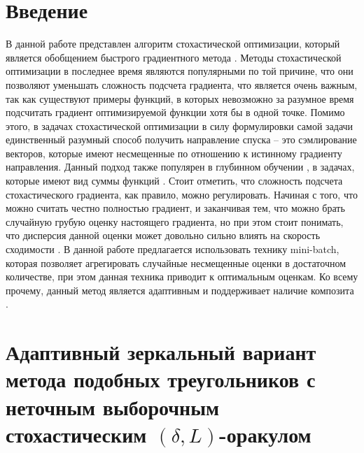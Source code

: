 \documentclass[11pt,a4]{article}
\begin{document}
\section{Введение}
В данной работе представлен алгоритм стохастической оптимизации, который является обобщением быстрого градиентного метода \cite{nesterov2013introductory}. Методы стохастической оптимизации в последнее время являются популярными по той причине, что они позволяют уменьшать сложность подсчета градиента, что является очень важным, так как существуют примеры функций, в которых невозможно за разумное время подсчитать градиент оптимизируемой функции хотя бы в одной точке. Помимо этого, в задачах стохастической оптимизации \cite{gasnikov2016netrivialnosti} в силу формулировки самой задачи единственный разумный способ получить направление спуска -- это сэмлирование векторов, которые имеют несмещенные по отношению к истинному градиенту направления. Данный подход также популярен в глубинном обучении \cite{krizhevsky2012imagenet}, в задачах, которые имеют вид суммы функций \cite{gasnikov2016netrivialnosti}. Стоит отметить, что сложность подсчета стохастического градиента, как правило, можно регулировать. Начиная с того, что можно считать честно полностью градиент, и заканчивая тем, что можно брать случайную грубую оценку настоящего градиента, но при этом стоит понимать, что дисперсия данной оценки может довольно сильно влиять на скорость сходимости \cite{lan2012optimal,devolder2013exactness}. В данной работе предлагается использовать технику mini-batch, которая позволяет агрегировать случайные несмещенные оценки в достаточном количестве, при этом данная техника приводит к оптимальным оценкам. Ко всему прочему, данный метод является адаптивным \cite{gasnikov2018universal} и поддерживает наличие композита \cite{lan2012optimal}.

\section{Адаптивный зеркальный вариант метода подобных треугольников с неточным выборочным стохастическим $(\delta, L)$-оракулом} \label{sec:mmtDLST}
\end{document}
